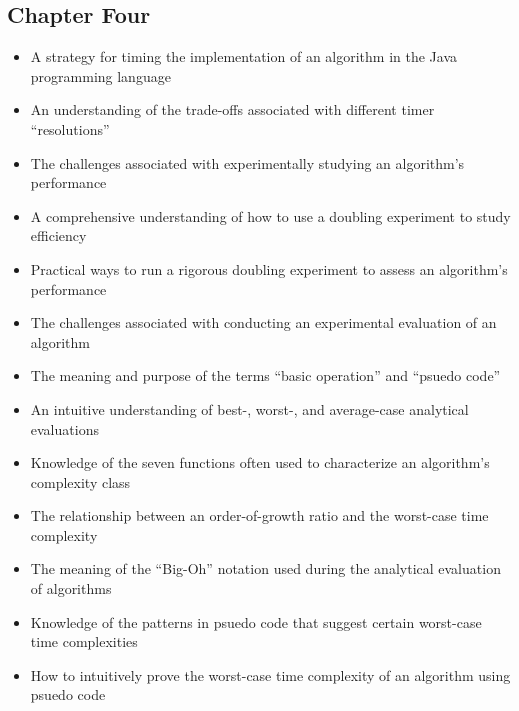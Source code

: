 \documentclass[11pt]{article}
\begin{document}
\vspace*{-.2in}
\subsection*{Chapter Four}

\begin{itemize}

  \item A strategy for timing the implementation of an algorithm in the Java
    programming language

  \item An understanding of the trade-offs associated with different timer
    ``resolutions''

  \item The challenges associated with experimentally studying an algorithm's
    performance

  \item A comprehensive understanding of how to use a doubling experiment to
    study efficiency

  \item Practical ways to run a rigorous doubling experiment to assess an algorithm's
    performance

  \item The challenges associated with conducting an experimental evaluation of
    an algorithm

  \item The meaning and purpose of the terms ``basic operation'' and ``psuedo code''

  \item An intuitive understanding of best-, worst-, and average-case analytical
    evaluations

  \item Knowledge of the seven functions often used to characterize an
    algorithm's complexity class

  \item The relationship between an order-of-growth ratio and the worst-case
    time complexity

  \item The meaning of the ``Big-Oh'' notation used during the
    analytical evaluation of algorithms

  \item Knowledge of the patterns in psuedo code that suggest certain
    worst-case time complexities

  \item How to intuitively prove the worst-case time complexity of an algorithm
    using psuedo code

\end{itemize}
\end{document}
